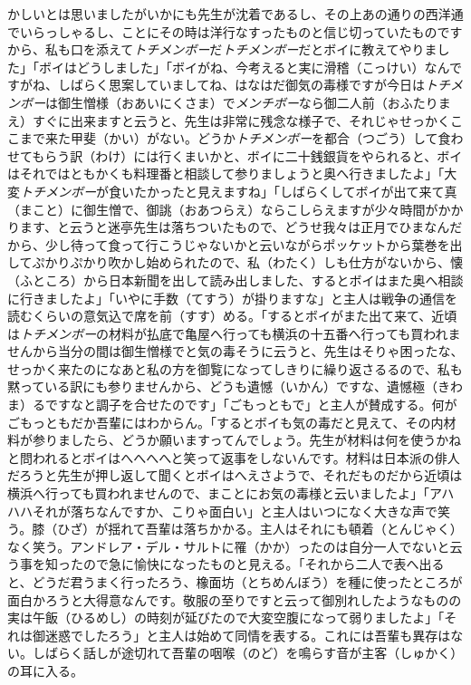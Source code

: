 \documentclass{book}
\begin{document}
かしいとは思いましたがいかにも先生が沈着であるし、その上あの通りの西洋通でいらっしゃるし、ことにその時は洋行なすったものと信じ切っていたものですから、私も口を添えて\emph{トチメンボー}だ\emph{トチメンボー}だとボイに教えてやりました」「ボイはどうしました」「ボイがね、今考えると実に滑稽（こっけい）なんですがね、しばらく思案していましてね、はなはだ御気の毒様ですが今日は\emph{トチメンボー}は御生憎様（おあいにくさま）で\emph{メンチボー}なら御二人前（おふたりまえ）すぐに出来ますと云うと、先生は非常に残念な様子で、それじゃせっかくここまで来た甲斐（かい）がない。どうか\emph{トチメンボー}を都合（つごう）して食わせてもらう訳（わけ）には行くまいかと、ボイに二十銭銀貨をやられると、ボイはそれではともかくも料理番と相談して参りましょうと奥へ行きましたよ」「大変\emph{トチメンボー}が食いたかったと見えますね」「しばらくしてボイが出て来て真（まこと）に御生憎で、御誂（おあつらえ）ならこしらえますが少々時間がかかります、と云うと迷亭先生は落ちついたもので、どうせ我々は正月でひまなんだから、少し待って食って行こうじゃないかと云いながらポッケットから葉巻を出してぷかりぷかり吹かし始められたので、私（わたく）しも仕方がないから、懐（ふところ）から日本新聞を出して読み出しました、するとボイはまた奥へ相談に行きましたよ」「いやに手数（てすう）が掛りますな」と主人は戦争の通信を読むくらいの意気込で席を前（すす）める。「するとボイがまた出て来て、近頃は\emph{トチメンボー}の材料が払底で亀屋へ行っても横浜の十五番へ行っても買われませんから当分の間は御生憎様でと気の毒そうに云うと、先生はそりゃ困ったな、せっかく来たのになあと私の方を御覧になってしきりに繰り返さるるので、私も黙っている訳にも参りませんから、どうも遺憾（いかん）ですな、遺憾極（きわま）るですなと調子を合せたのです」「ごもっともで」と主人が賛成する。何がごもっともだか吾輩にはわからん。「するとボイも気の毒だと見えて、その内材料が参りましたら、どうか願いますってんでしょう。先生が材料は何を使うかねと問われるとボイはへへへへと笑って返事をしないんです。材料は日本派の俳人だろうと先生が押し返して聞くとボイはへえさようで、それだものだから近頃は横浜へ行っても買われませんので、まことにお気の毒様と云いましたよ」「アハハハそれが落ちなんですか、こりゃ面白い」と主人はいつになく大きな声で笑う。膝（ひざ）が揺れて吾輩は落ちかかる。主人はそれにも頓着（とんじゃく）なく笑う。アンドレア・デル・サルトに罹（かか）ったのは自分一人でないと云う事を知ったので急に愉快になったものと見える。「それから二人で表へ出ると、どうだ君うまく行ったろう、橡面坊（とちめんぼう）を種に使ったところが面白かろうと大得意なんです。敬服の至りですと云って御別れしたようなものの実は午飯（ひるめし）の時刻が延びたので大変空腹になって弱りましたよ」「それは御迷惑でしたろう」と主人は始めて同情を表する。これには吾輩も異存はない。しばらく話しが途切れて吾輩の咽喉（のど）を鳴らす音が主客（しゅかく）の耳に入る。
\end{document}
